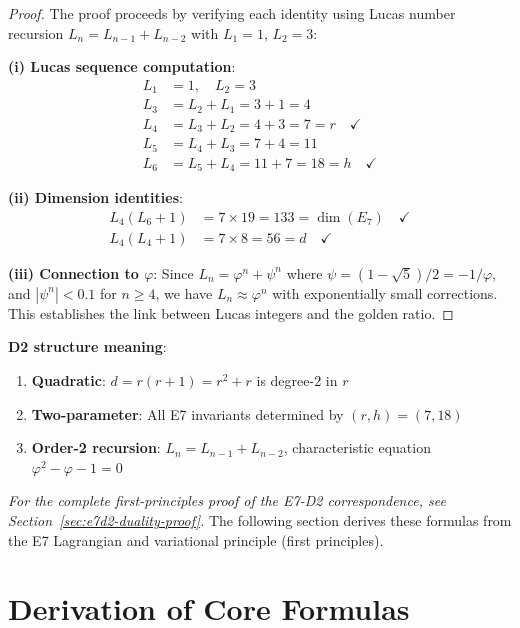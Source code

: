 \documentclass[11pt,a4paper]{article}
\begin{document}
\begin{proof}
The proof proceeds by verifying each identity using Lucas number recursion $L_n = L_{n-1} + L_{n-2}$ with $L_1 = 1$, $L_2 = 3$:

\textbf{(i) Lucas sequence computation}:
\begin{align}
L_1 &= 1, \quad L_2 = 3 \\
L_3 &= L_2 + L_1 = 3 + 1 = 4 \\
L_4 &= L_3 + L_2 = 4 + 3 = 7 = r \quad \checkmark \\
L_5 &= L_4 + L_3 = 7 + 4 = 11 \\
L_6 &= L_5 + L_4 = 11 + 7 = 18 = h \quad \checkmark
\end{align}

\textbf{(ii) Dimension identities}:
\begin{align}
L_4(L_6 + 1) &= 7 \times 19 = 133 = \dim(E_7) \quad \checkmark \\
L_4(L_4 + 1) &= 7 \times 8 = 56 = d \quad \checkmark
\end{align}

\textbf{(iii) Connection to $\varphi$}: Since $L_n = \varphi^n + \psi^n$ where $\psi = (1-\sqrt{5})/2 = -1/\varphi$, and $|\psi^n| < 0.1$ for $n \geq 4$, we have $L_n \approx \varphi^n$ with exponentially small corrections. This establishes the link between Lucas integers and the golden ratio.
\end{proof}

\textbf{D2 structure meaning}:
\begin{enumerate}
\item \textbf{Quadratic}: $d = r(r+1) = r^2 + r$ is degree-2 in $r$
\item \textbf{Two-parameter}: All E7 invariants determined by $(r, h) = (7, 18)$
\item \textbf{Order-2 recursion}: $L_n = L_{n-1} + L_{n-2}$, characteristic equation $\varphi^2 - \varphi - 1 = 0$
\end{enumerate}

\textit{For the complete first-principles proof of the E7-D2 correspondence, see Section~\ref{sec:e7d2-duality-proof}.} The following section derives these formulas from the E7 Lagrangian and variational principle (first principles).

\section{Derivation of Core Formulas}
\label{sec:derivation-core}
\end{document}
